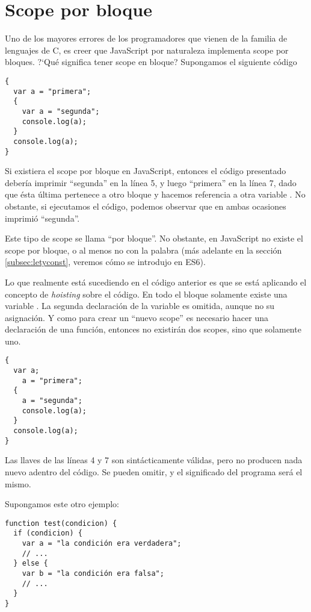 \section{Scope por bloque}
\label{sec:scopebloque}

Uno de los mayores errores de los programadores que vienen de la familia de lenguajes de C, es creer que JavaScript por naturaleza implementa scope por bloques. ?`Qué significa tener scope en bloque? Supongamos el siguiente código

\begin{lstlisting}
{
  var a = "primera";
  {
    var a = "segunda";
    console.log(a);
  }
  console.log(a);
}
\end{lstlisting}

Si existiera el scope por bloque en JavaScript, entonces el código presentado debería imprimir "`segunda"' en la línea 5, y luego "`primera"' en la línea 7, dado que ésta última pertenece a otro bloque y hacemos referencia a otra variable . No obstante, si ejecutamos el código, podemos observar que en ambas ocasiones imprimió "`segunda"'.

Este tipo de scope se llama "`por bloque"'. No obstante, en JavaScript no existe el scope por bloque, o al menos no con la palabra  (más adelante en la sección \ref{subsec:letyconst}, veremos cómo se introdujo en ES6).

Lo que realmente está sucediendo en el código anterior es que se está aplicando el concepto de \textit{hoisting} sobre el código. En todo el bloque solamente existe una variable . La segunda declaración de la variable es omitida, aunque no su asignación. Y como para crear un "`nuevo scope"' es necesario hacer una declaración de una función, entonces no existirán dos scopes, sino que solamente uno.

\begin{lstlisting}[title={Código equivalente al ejemplo anterior}]
{
  var a;
	a = "primera";
  {
    a = "segunda";
    console.log(a);
  }
  console.log(a);
}
\end{lstlisting}

Las llaves \code{\{\}} de las líneas 4 y 7 son sintácticamente válidas, pero no producen nada nuevo adentro del código. Se pueden omitir, y el significado del programa será el mismo.

Supongamos este otro ejemplo:

\begin{lstlisting}
function test(condicion) {
  if (condicion) {
    var a = "la condición era verdadera";
    // ...
  } else {
    var b = "la condición era falsa";
    // ...
  }
}
\end{lstlisting}

